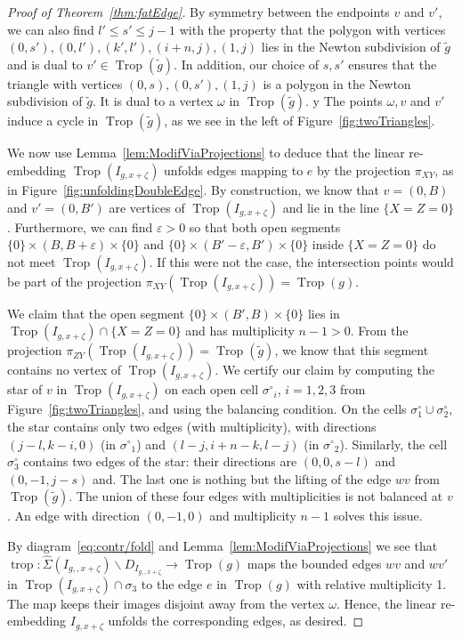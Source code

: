 \documentclass[11pt]{amsart}
\numberwithin{equation}{section}
\theoremstyle{plain}
\theoremstyle{definition}
\theoremstyle{remark}
\begin{document}
\begin{proof}[Proof of Theorem~\ref{thm:fatEdge}]
By symmetry between the endpoints $v$ and $v'$, we can also find
$l'\leq s'\leq j-1$ with the property that the polygon with vertices
$(0,s'),(0,l'), (k',l'), (i+n,j), (1,j)$ lies in the Newton
subdivision of $\tilde{g}$ and is dual to $v'\in \operatorname{Trop}(\tilde{g})$.
In addition, our choice of $s,s'$ ensures that the triangle with
vertices $(0,s),(0,s'),(1,j)$ is a polygon in the Newton subdivision
of $\tilde{g}$. It is dual to a vertex ${\omega}$ in $\operatorname{Trop}(\tilde{g})$. y
The points ${\omega}, v$ and $v'$ induce a cycle in $\operatorname{Trop}(\tilde{g})$, as
we see in the left of Figure~\ref{fig:twoTriangles}.

We now use Lemma~\ref{lem:ModifViaProjections} to deduce that the
linear re-embedding $\operatorname{Trop}(I_{g,x+{\zeta}})$ unfolds edges mapping to $e$
by the projection $\pi_{XY}$, as in
Figure~\ref{fig:unfoldingDoubleEdge}.  By construction, we know that
$v=(0,B)$ and $v'=(0,B')$ are vertices of $\operatorname{Trop}(I_{g,x+{\zeta}})$ and lie
in the line $\{X=Z=0\}$.  Furthermore, we can find $\varepsilon >0$ so
that both open segments $\{0\}\times (B,B+ \varepsilon)\times \{0\}$
and $\{0\}\times (B'-\varepsilon, B')\times \{0\}$ inside $\{X=Z=0\}$
do not meet $\operatorname{Trop}(I_{g,x+{\zeta}})$. If this were not the case, the
intersection points would be part of the projection
$\pi_{XY}(\operatorname{Trop}(I_{g,x+{\zeta}}))=\operatorname{Trop}(g)$.

We claim that the open segment $\{0\}\times (B',B)\times \{0\}$ lies
in $\operatorname{Trop}(I_{g,x+{\zeta}})\cap \{X=Z=0\}$ and has multiplicity
$n-1>0$. From the projection
$\pi_{ZY}(\operatorname{Trop}(I_{g,x+{\zeta}}))=\operatorname{Trop}(\tilde{g})$, we know that this
segment contains no vertex of $\operatorname{Trop}(I_{g,x+{\zeta}})$. We certify our
claim by computing the star of $v$ in $\operatorname{Trop}(I_{g,x+{\zeta}})$ on each
open cell ${\sigma^{\circ}}_i$, $i=1,2,3$ from Figure~\ref{fig:twoTriangles},
and using the balancing condition. On the cells $\sigma_1^{\circ} \cup
\sigma_2^{\circ}$, the star contains only two edges (with
multiplicity), with directions $(j-l,k-i,0)$ (in ${\sigma^{\circ}}_1$) and
$(l-j,i+n-k,l-j)$ (in ${\sigma^{\circ}}_2$). Similarly, the cell
$\sigma_3^{\circ}$ contains two edges of the star: their directions
are $(0,0,s-l)$ and $(0,-1,j-s)$ and. The last one is nothing but the
lifting of the edge $wv$ from $\operatorname{Trop}(\tilde{g})$. The union of these
four edges with multiplicities is not balanced at $v$. An edge with
direction $(0,-1,0)$ and multiplicity $n-1$ solves this issue.

By diagram~\eqref{eq:contr/fold} and
Lemma~\ref{lem:ModifViaProjections} we see that $ \operatorname{trop}\colon
\widehat{\Sigma}(I_{g,,x+{\zeta}})\smallsetminus
D_{I_{g,,x+{\zeta}}}\rightarrow \operatorname{Trop}(g)$ maps the bounded edges $wv$ and
$wv'$ in $\operatorname{Trop}(I_{g,x+{\zeta}})\cap \sigma_3$ to the edge $e$ in
$\operatorname{Trop}(g)$ with relative multiplicity 1. The map keeps their images
disjoint away from the vertex ${\omega}$. Hence, the linear re-embedding
$I_{g,x+{\zeta}}$ unfolds the corresponding edges, as desired.
\end{proof}
\end{document}
